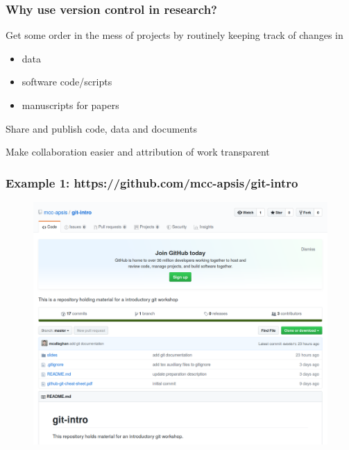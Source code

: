 \documentclass{beamer}
\begin{document}


\begin{frame}
\frametitle{Why use version control in research?}


Get some order in the mess of projects by routinely keeping track of changes in
\begin{itemize}
\item data
\item software code/scripts
\item manuscripts for papers
\end{itemize}

\bigskip

Share and publish code, data and documents

\bigskip

Make collaboration easier and attribution of work transparent


\end{frame}

\begin{frame}
\frametitle{Example 1: https://github.com/mcc-apsis/git-intro}

\begin{figure}
	\includegraphics[width=0.95\linewidth]{images/git-intro.png}
\end{figure}


\end{frame}
\end{document}
